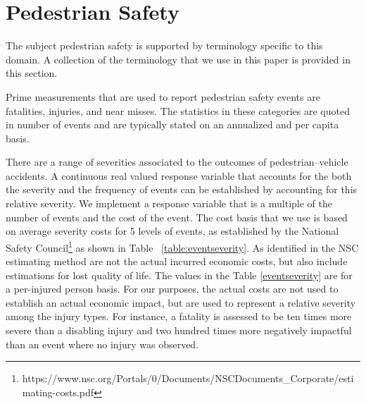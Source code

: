 \documentclass{llncs}
\begin{document}
\section{Pedestrian Safety}
%
The subject pedestrian safety is supported by terminology specific to this domain. A collection of the terminology that we use in this paper is provided in this section. 

Prime measurements that are used to report pedestrian safety events are fatalities, injuries, and near misses. The statistics in these categories are quoted in number of events and are typically stated on an annualized and per capita basis.

There are a range of severities associated to the outcomes of pedestrian--vehicle accidents. A continuous real valued response variable that accounts for the both the severity and the frequency of events can be established by accounting for this relative severity. We implement a response variable that is a multiple of the number of events and the cost of the event. The cost basis that we use is based on average severity costs for 5 levels of events, as established by the National Safety Council\footnote{https://www.nsc.org/Portals/0/Documents/NSCDocuments_Corporate/estimating-costs.pdf} as shown in Table ~\ref{table:eventseverity}. As identified in the NSC estimating method are not the actual incurred economic costs, but also include estimations for lost quality of life. The values in the Table \ref{eventseverity} are for a per-injured person basis. For our purposes, the actual costs are not used to establish an actual economic impact, but are used to represent a relative severity among the injury types. For instance, a fatality is assessed to be ten times more severe than a disabling injury and two hundred times more negatively impactful than an event where no injury was observed.
\end{document}
